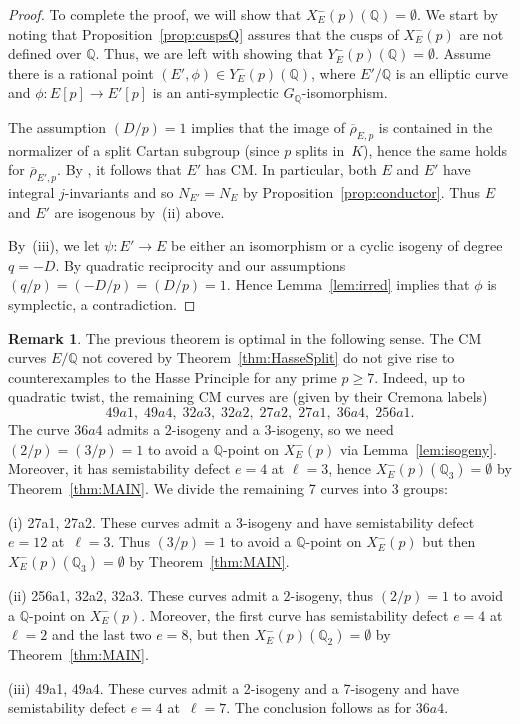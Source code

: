 \documentclass[12pt]{amsart}
\numberwithin{equation}{section}
\theoremstyle{definition}
\newtheorem{remark}[equation]{Remark}
\newcommand{\Q}{\mathbb{Q}}
\newcommand{\rhobar}{{\overline{\rho}}}
\newcommand{\Xp}{X_E^{-}(p)}
\begin{document}
\begin{proof}
To complete the proof, we will show that $\Xp(\Q) = \emptyset$. We start by noting that Proposition~\ref{prop:cuspsQ} assures that the cusps of $\Xp$ are not defined over $\Q$. Thus, we are left with showing that $Y^-_E(p)(\Q) = \emptyset$. Assume there is a rational point $(E', \phi) \in Y^-_E(p)(\Q)$, where $E'/\Q$ is an elliptic curve and 
$\phi : E[p] \to E'[p]$ is an anti-symplectic $G_\Q$-isomorphism.

The assumption $(D/p) = 1$ implies that the image of $\rhobar_{E,p}$ is contained in the normalizer of a split Cartan subgroup (since $p$ splits in~$K$), hence the same holds for
$\rhobar_{E',p}$. By \cite[Theorem 1.2]{Xsplit13}, it follows that $E'$ has CM. In particular, both $E$ and $E'$ have integral $j$-invariants and so
$N_{E'}= N_{E}$ by Proposition~\ref{prop:conductor}. Thus $E$ and $E'$ are isogenous by~(ii) above.

By~(iii), we let $\psi : E' \to E$ be either an isomorphism or a cyclic isogeny of degree~$q = -D$. By quadratic reciprocity and our assumptions $(q/p)=(-D/p)=(D/p)=1$. Hence Lemma~\ref{lem:irred} implies that $\phi$ is symplectic, a contradiction.
\end{proof}
\begin{remark}\label{rem:CM} The previous theorem is optimal in the following sense. The CM curves $E/\Q$ not covered by Theorem~\ref{thm:HasseSplit} do not give rise to counterexamples to the Hasse Principle for any prime $p\geq 7$.
Indeed, up to quadratic twist, the remaining CM curves are (given by their Cremona labels)
\[
 49a1, \; 49a4, \; 32a3, \; 32a2, \; 27a2, \; 27a1, \; 36a4, \; 256a1.
\]
The curve $36a4$ admits a $2$-isogeny and a $3$-isogeny, so we need $(2/p) = (3/p) = 1$ to avoid a $\Q$-point on $\Xp$ via Lemma~\ref{lem:isogeny}. Moreover, it has semistability defect $e=4$ at $\ell=3$, hence $\Xp(\Q_3) = \emptyset$ by Theorem~\ref{thm:MAIN}. We divide the remaining 7 curves into 3 groups:

(i) 27a1, 27a2. These curves admit a $3$-isogeny and have semistability defect $e=12$ at~$\ell=3$. Thus $(3/p) = 1$ to avoid a $\Q$-point on $\Xp$ but then $\Xp(\Q_3) = \emptyset$ by Theorem~\ref{thm:MAIN}.

(ii) 256a1, 32a2, 32a3. These curves admit a $2$-isogeny, thus $(2/p) = 1$ to avoid a $\Q$-point on $\Xp$. Moreover, the first curve has semistability defect $e=4$ at~$\ell =2$ and the last two $e=8$, but then $\Xp(\Q_2) = \emptyset$ by Theorem~\ref{thm:MAIN}.

(iii) 49a1, 49a4. These curves admit a 2-isogeny and a 7-isogeny and have semistability defect $e = 4$ at~$\ell=7$. The conclusion follows as for $36a4$.
\end{remark}
\end{document}
